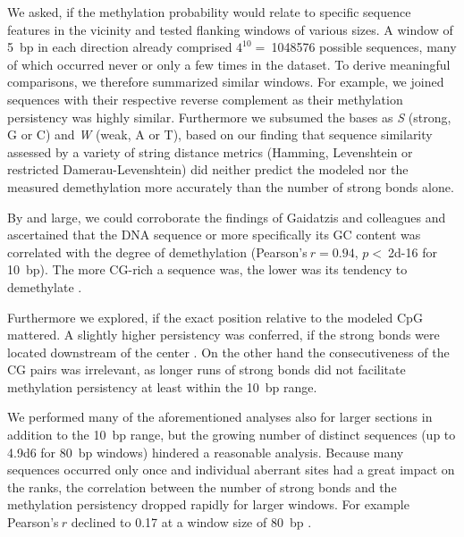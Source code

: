 We asked, if the methylation probability would relate to specific sequence features in the vicinity and tested flanking windows of various sizes. A window of \SI{5}{bp} in each direction already comprised $4^{10} =\ $\num{1048576} possible sequences, many of which occurred never or only a few times in the dataset.  To derive meaningful comparisons, we therefore summarized similar windows. For example, we joined sequences with their respective reverse complement as their methylation persistency was highly similar. Furthermore we subsumed the bases as \emph{S} (strong, G or C) and \emph{W} (weak, A or T), based on our finding that sequence similarity assessed by a variety of string distance metrics (Hamming, Levenshtein or restricted Damerau-Levenshtein) did neither predict the modeled nor the measured demethylation more accurately than the number of strong bonds alone\dns. 

By and large, we could corroborate the findings of Gaidatzis and colleagues\cite{Gaidatzis2014} and ascertained that the DNA sequence or more specifically its GC content was correlated with the degree of demethylation (Pearson's$\ r = 0.94$, $p <\ $\num{2d-16} for \SI{10}{bp}). The more CG-rich a sequence was, the lower was its tendency to demethylate . 

Furthermore we explored, if the exact position relative to the modeled CpG mattered. A slightly higher persistency was conferred, if the strong bonds were located downstream of the center . On the other hand the consecutiveness of the CG pairs was irrelevant, as longer runs of strong bonds did not facilitate methylation persistency at least within the \SI{10}{bp} range. 

We performed many of the aforementioned analyses also for larger sections in addition to the \SI{10}{bp} range, but the growing number of distinct sequences (up to \num{4.9d6} for \SI{80}{bp} windows) hindered a reasonable analysis. Because many sequences occurred only once and individual aberrant sites had a great impact on the ranks, the correlation between the number of strong bonds and the methylation persistency dropped rapidly for larger windows. For example Pearson's$\ r$ declined to \num{0.17} at a window size of \SI{80}{bp} . 

